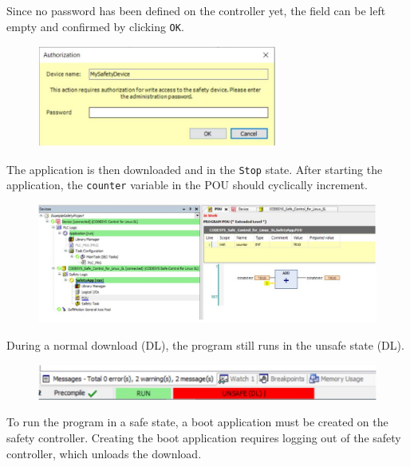 \documentclass[a4paper,12pt]{article}
\begin{document}
Since no password has been defined on the controller yet, the field can be left empty and confirmed by clicking \texttt{OK}.
\begin{figure}[H]
	\centering
	\includegraphics[width=0.7\textwidth]{e10.JPG}
\end{figure}
The application is then downloaded and in the \texttt{Stop} state. After starting the application, the \texttt{counter} variable in the POU should cyclically increment. 
\begin{figure}[H]
	\centering
	\includegraphics[width=1\textwidth]{e11.JPG}
\end{figure}
During a normal download (DL), the program still runs in the unsafe state (DL).
\begin{figure}[H]
	\centering
	\includegraphics[width=1\textwidth]{e13.JPG}
\end{figure}
To run the program in a safe state, a boot application must be created on the safety controller. Creating the boot application requires logging out of the safety controller, which unloads the download.
\end{document}
